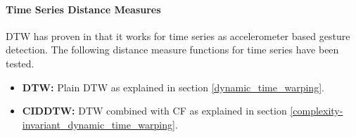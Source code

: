 \paragraph{Time Series Distance Measures} \label{time_series_distance_measures}
DTW has proven in \cite{liu2009uwave} that it works for time series as accelerometer based gesture detection. The
following distance measure functions for time series have been tested.

\begin{itemize}
    \item \textbf{DTW:} Plain DTW as explained in section \ref{dynamic_time_warping}.
    \item \textbf{CIDDTW:} DTW combined with CF as explained in section \ref{complexity-invariant_dynamic_time_warping}.
\end{itemize}

